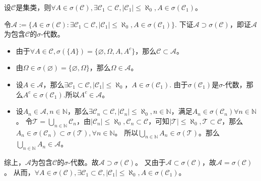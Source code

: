 \documentclass{ctexart}
\begin{document}
\begin{problem}\label{pro:1.4.3}
  设\(\mathcal{C} \)是集类，则\(\forall A \in \sigma(\mathcal{C}),\exists \mathcal{C}_1 \subset \mathcal{C},|\mathcal{C}_1| \leq \aleph_0,A \in \sigma(\mathcal{C}_1) \)。
\end{problem}
\begin{solution}
  令\(\mathcal{A}:=\{A \in \sigma(\mathcal{C}):\exists \mathcal{C}_1 \subset \mathcal{C}, |\mathcal{C}_1| \leq \aleph_0, A \in \sigma(\mathcal{C}_1) \}\).
  下证\(\mathcal{A} \supset \sigma (\mathcal{C}) \)，即证\(\mathcal{A} \)为包含\(\mathcal{C} \)的\(\sigma \)-代数。
  \begin{itemize}
    \item 由于\(\forall A \in \mathcal{C} , \sigma(\{A\})=\{\varnothing,\Omega,A,A^c\} \)，那么\(\mathcal{C}  \subset \mathcal{A} \)。
    \item 由\(\Omega \in \sigma(\varnothing)=\{\varnothing,\Omega\} \)，那么\(\Omega \in \mathcal{A} \)。
    \item 设\(A \in \mathcal{A} \)，那么\(\exists \mathcal{C}_1 \subset \mathcal{C}, |\mathcal{C}_1|\leq \aleph_0\)，\(A \in \sigma(\mathcal{C}_1) \).
      由于\(\sigma(\mathcal{C}_1) \)是\(\sigma \)-代数，那么\(A^c \in \sigma(\mathcal{C}_1) \).所以\(A^c \in \mathcal{A} \)。
    \item 设\(A_n \in \mathcal{A} ,n \in \mathbb{N}\)，那么\(\exists \mathcal{C}_n \subset \mathcal{C} , |\mathcal{C}_n|\leq \aleph_0,n \in \mathbb{N}   \)，满足\(A_n \in \sigma(\mathcal{C}_n) \forall n \in \mathbb{N}\)。
      令\(\mathcal{T}=\bigcup_{n \in \mathbb{N}} \mathcal{C}_n \)，由\(|\mathcal{C}_n|\leq \aleph_0 ,\mathcal{C}_n \subset \mathcal{C}\)，可知\(|\mathcal{T}| \leq \aleph_0,\mathcal{T} \subset \mathcal{C} \)，那么\(A_n \in \sigma(\mathcal{C}_n)\subset \sigma (\mathcal{T}), \forall n \in \mathbb{N}\)。
      所以\(\bigcup_{n \in \mathbb{N} }A_n \in \sigma(\mathcal{T}) \)。那么\(\bigcup_{n \in \mathbb{N}}A_n \in \mathcal{A} \)。
  \end{itemize}
 综上，\(\mathcal{A} \)为包含\(\mathcal{C} \)的\(\sigma \)-代数。故\(\mathcal{A} \supset \sigma(\mathcal{C}) \)。 
 又由于\(\mathcal{A} \subset \sigma(\mathcal{C}) \)，故\(\mathcal{A}=\sigma(\mathcal{C}) \)。
从而，\(\forall A \in \sigma(\mathcal{C}),\exists \mathcal{C}_1 \subset \mathcal{C},|\mathcal{C}_1| \leq \aleph_0,A \in \sigma(\mathcal{C}_1) \)。
\end{solution}
\end{document}
